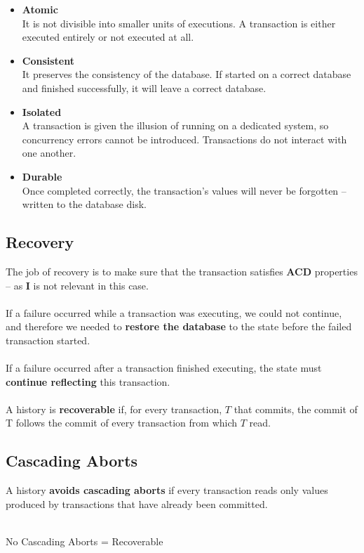\documentclass{article}
\begin{document}
\begin{itemize}
	\item \textbf{Atomic}
	\vspace{.2cm} \\
	It is not divisible into smaller units of executions. A transaction is either executed entirely or not executed at all.
	
	\item \textbf{Consistent}
	\vspace{.2cm} \\
	It preserves the consistency of the database. If started on a correct database and finished successfully, it will leave a correct database.
	
	\item \textbf{Isolated}
	\vspace{.2cm} \\
	A transaction is given the illusion of running on a dedicated system, so concurrency errors cannot be introduced. Transactions do not interact with one another.
	
	\item \textbf{Durable}
	\vspace{.2cm} \\
	Once completed correctly, the transaction's values will never be forgotten -- written to the database disk.
\end{itemize}

\subsection{Recovery}
The job of recovery is to make sure that the transaction satisfies \textbf{ACD} properties -- as \textbf{I} is not relevant in this case. \\ \\
If a failure occurred while a transaction was executing, we could not continue, and therefore we needed to \textbf{restore the database} to the state before the failed transaction started. \\ \\
If a failure occurred after a transaction finished executing, the state must \textbf{continue reflecting} this transaction. \\ \\
A history is \textbf{recoverable} if, for every transaction, $T$ that commits, the commit of T follows the commit of every transaction from which $T$ read.

\subsection{Cascading Aborts}
A history \textbf{avoids cascading aborts} if every transaction reads only values produced by transactions that have already been committed. \\ \\
\centerline{No Cascading Aborts = Recoverable}
\end{document}
